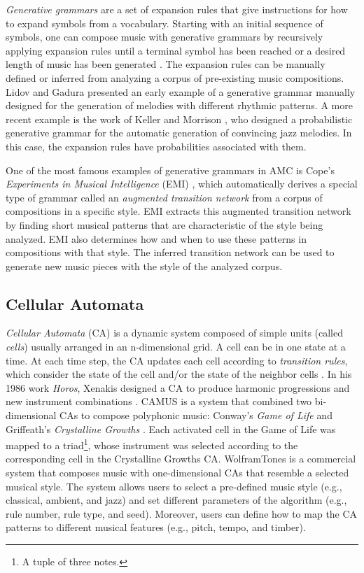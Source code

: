 \textit{Generative grammars} are a set of expansion rules that give instructions for how to expand symbols from a vocabulary. Starting with an initial sequence of symbols, one can compose music with generative grammars by recursively applying expansion rules until a terminal symbol has been reached or a desired length of music has been generated \cite{holtzman1981using}. The expansion rules can be manually defined or inferred from analyzing a corpus of pre-existing music compositions. Lidov and Gadura \cite{lidov1973melody} presented an early example of a generative grammar manually designed for the generation of melodies with different rhythmic patterns. A more recent example is the work of Keller and Morrison \cite{keller2007grammatical}, who designed a probabilistic generative grammar for the automatic generation of convincing jazz melodies. In this case, the expansion rules have probabilities associated with them.

One of the most famous examples of generative grammars in AMC is Cope's \textit{Experiments in Musical Intelligence} (EMI) \cite{cope1989experiments}, which automatically derives a special type of grammar called an \textit{augmented transition network} from a corpus of compositions in a specific style. EMI extracts this augmented transition network by finding short musical patterns that are characteristic of the style being analyzed. EMI also determines how and when to use these patterns in compositions with that style. The inferred transition network can be used to generate new music pieces with the style of the analyzed corpus.

\subsection{Cellular Automata}

\textit{Cellular Automata} (CA) is a dynamic system composed of simple units (called \textit{cells}) usually arranged in an n-dimensional grid. A cell can be in one state at a time. At each time step, the CA updates each cell according to \textit{transition rules}, which consider the state of the cell and/or the state of the neighbor cells \cite{wolfram2002new}. In his 1986 work \textit{Horos}, Xenakis designed a CA to produce harmonic progressions and new instrument combinations \cite{solomos2005cellular}. CAMUS \cite{miranda1993cellular} is a system that combined two bi-dimensional CAs to compose polyphonic music: Conway's \textit{Game of Life} \cite{gardner1970} and Griffeath’s \textit{Crystalline Growths} \cite{dewdney1989}. Each activated cell in the Game of Life was mapped to a triad\footnote{A tuple of three notes.}, whose instrument was selected according to the corresponding cell in the Crystalline Growths CA. WolframTones \cite{ball2005making} is a commercial system that composes music with one-dimensional CAs that resemble a selected musical style. The system allows users to select a pre-defined music style (e.g., classical, ambient, and jazz) and set different parameters of the algorithm (e.g., rule number, rule type, and seed). Moreover, users can define how to map the CA patterns to different musical features (e.g., pitch, tempo, and timber).

